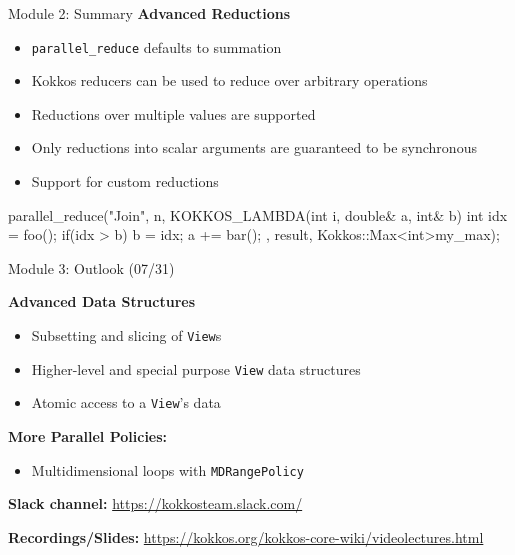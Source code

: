 \begin{frame}[fragile]{Module 2: Summary}
	\textbf{Advanced Reductions}
	\begin{itemize}
        \item \texttt{parallel\_reduce} defaults to summation
        \item Kokkos reducers can be used to reduce over arbitrary operations
        \item Reductions over multiple values are supported
        \item Only reductions into scalar arguments are guaranteed to be synchronous
        \item Support for custom reductions
	\end{itemize}

\begin{code}[keywords={View,int,CudaSpace}]
    parallel_reduce("Join", n,
      KOKKOS_LAMBDA(int i, double& a, int& b) {
        int idx = foo();
        if(idx > b) b = idx;
        a += bar();
      }, result, Kokkos::Max<int>{my_max});
\end{code}

\end{frame}

\begin{frame}{Module 3: Outlook (07/31)}

	\vspace{10pt}
	\textbf{Advanced Data Structures}
	\begin{itemize}
        \item Subsetting and slicing of \texttt{View}s
        \item Higher-level and special purpose \texttt{View} data structures
        \item Atomic access to a \texttt{View}'s data
	\end{itemize}

	\vspace{10pt}
	\textbf{More Parallel Policies:}
	\begin{itemize}
		\item Multidimensional loops with \texttt{MDRangePolicy}
	\end{itemize}

	\vspace{10pt}
    \textbf{Slack channel:} {\scriptsize \url{https://kokkosteam.slack.com/}}
	
	\vspace{10pt}
	\textbf{Recordings/Slides:} {\scriptsize \url{https://kokkos.org/kokkos-core-wiki/videolectures.html}}

\end{frame}



